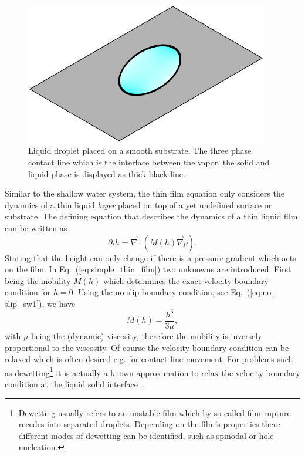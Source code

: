\begin{figure}
    \centering
    \includegraphics[width=0.95\textwidth]{graphics/contact_line.pdf}
    \caption{Liquid droplet placed on a smooth substrate.
    The three phase contact line which is the interface between the vapor, the solid and liquid phase is displayed as thick black line.}
    \label{fig:contact_line_drop}
\end{figure}
Similar to the shallow water system, the thin film equation only considers the dynamics of a thin liquid \textit{layer} placed on top of a yet undefined surface or substrate.
The defining equation that describes the dynamics of a thin liquid film can be written as~\cite{THIELE2014399, RevModPhys.69.931, RevModPhys.81.1131, RevModPhys.81.739} 
\begin{equation}\label{eq:simple_thin_film}
    \partial_t h = \vec{\nabla}\cdot\left(M(h)\vec{\nabla} p\right).
\end{equation}
Stating that the height can only change if there is a pressure gradient which acts on the film.
In Eq.~(\ref{eq:simple_thin_film}) two unknowns are introduced.
First being the mobility $M(h)$ which determines the exact velocity boundary condition for $h=0$.
Using the no-slip boundary condition, see Eq.~(\ref{eq:no-slip_sw1}), we have 
\begin{equation}\label{eq:no-slip-mobility}
    M(h) = \frac{h^3}{3\mu},
\end{equation}
with $\mu$ being the (dynamic) viscosity, therefore the mobility is inversely proportional to the viscosity.
Of course the velocity boundary condition can be relaxed which is often desired e.g. for contact line movement.
For problems such as dewetting\footnote{Dewetting usually refers to an unstable film which by so-called film rupture recedes into separated droplets. Depending on the film's properties there different modes of dewetting can be identified, such as spinodal or hole nucleation.} it is actually a known approximation to relax the velocity boundary condition at the liquid solid interface~\cite{M_nch_2005, munch2005lubrication, PhysRevLett.95.127801}.
